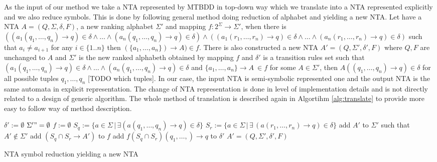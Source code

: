 \documentclass[a4paper, 12pt]{article}
\begin{document}
As the input of our method we take a NTA represented by MTBDD in top-down way
which we translate into a NTA represented explicitly and we also reduce symbols.
This is done by following general method doing reduction of alphabet and yielding a new NTA.
Let have a NTA $A=(Q, \Sigma, \delta, F)$, a new ranking alphabet $\Sigma'$ and mapping $f: 2^\Sigma \rightarrow \Sigma'$,
when there is $((a_1(q_1,\ldots,q_n) \rightarrow q) \in \delta \wedge \ldots \wedge (a_n(q_1,\ldots,q_n) \rightarrow q) \in \delta) \wedge
((a_1(r_1,\ldots,r_n) \rightarrow q) \in \delta \wedge \ldots \wedge (a_n(r_1,\ldots,r_n) \rightarrow q) \in \delta)$
such that $a_i \neq a_{i+1}$ for any $i\in \{1..n\}$ then $(\{a_1, \ldots, a_n\}) \rightarrow A) \in f$.
There is also constructed a new NTA $A' = (Q, \Sigma', \delta', F)$ where $Q, F$ are unchanged to $A$ 
and $\Sigma'$ is the new ranked alphabeth obtained by mapping $f$ and $\delta'$ is a transition rules set such that
$(a_1(q_1, \ldots, q_n) \rightarrow q) \in \delta \wedge \ldots \wedge (a_n(q_1, \ldots, q_n) \rightarrow q) \in \delta$ and
$ \{a_1,\ldots,a_n\}  \rightarrow A~\in f$ for some $A \in \Sigma'$, then $A((q_1, \ldots, q_n) \rightarrow q) \in \delta$
for all possible tuples $q_1,\ldots,q_n$ [TODO which tuples].
In our case, the input NTA is semi-symbolic represented one and the output NTA is the same automata in explicit representation.
The change of NTA representation is done in level of implementation details and is not directly related to a design of generic algorithm.
The whole method of translation is described again in Algortihm \ref{alg:translate} to provide more easy to follow way of method description.

\begin{algorithm}[h]
\label{alg:translate}
    $\delta' := \emptyset $\;
    $\Sigma' "= \emptyset $\;
	$f := \emptyset$\;
    {
		{
			$S_q := \{ a\in \Sigma \,|\, \exists(a(q_1,\ldots,q_n) \rightarrow q) \in \delta\}$\;
			{
				$S_r := \{a\in \Sigma \,|\, \exists\, (a(r_1,\ldots,r_n) \rightarrow q) \in \delta\}$\;
				{
					add $A'$ to $\Sigma'$ such that $A' \not\in \Sigma'$\;
					add $(S_q \cap S_r \rightarrow A')$ to $f$\;
				}
				add $f(S_q \cap S_r)(q_1,\ldots,) \rightarrow q$ to $\delta'$\;
			}
		}
    }
	\Return $A' = (Q, \Sigma', \delta', F)$
\caption{NTA symbol reduction yielding a new NTA}
\end{algorithm}
\end{document}
